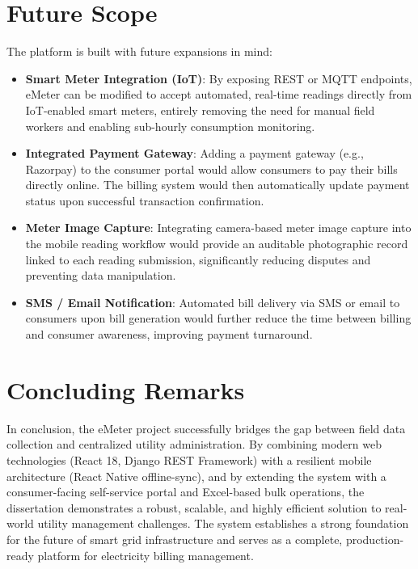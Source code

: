 \documentclass[12pt, a4paper, onecolumn]{report}
\begin{document}
\section{Future Scope}
The platform is built with future expansions in mind:

\begin{itemize}
    \item \textbf{Smart Meter Integration (IoT)}: By exposing REST or MQTT endpoints, eMeter can be modified to accept automated, real-time readings directly from IoT-enabled smart meters, entirely removing the need for manual field workers and enabling sub-hourly consumption monitoring.
    \item \textbf{Integrated Payment Gateway}: Adding a payment gateway (e.g., Razorpay) to the consumer portal would allow consumers to pay their bills directly online. The billing system would then automatically update payment status upon successful transaction confirmation.
    \item \textbf{Meter Image Capture}: Integrating camera-based meter image capture into the mobile reading workflow would provide an auditable photographic record linked to each reading submission, significantly reducing disputes and preventing data manipulation.
    \item \textbf{SMS / Email Notification}: Automated bill delivery via SMS or email to consumers upon bill generation would further reduce the time between billing and consumer awareness, improving payment turnaround.
\end{itemize}

\section{Concluding Remarks}
In conclusion, the eMeter project successfully bridges the gap between field data collection and centralized utility administration. By combining modern web technologies (React 18, Django REST Framework) with a resilient mobile architecture (React Native offline-sync), and by extending the system with a consumer-facing self-service portal and Excel-based bulk operations, the dissertation demonstrates a robust, scalable, and highly efficient solution to real-world utility management challenges. The system establishes a strong foundation for the future of smart grid infrastructure and serves as a complete, production-ready platform for electricity billing management.

\end{document}
